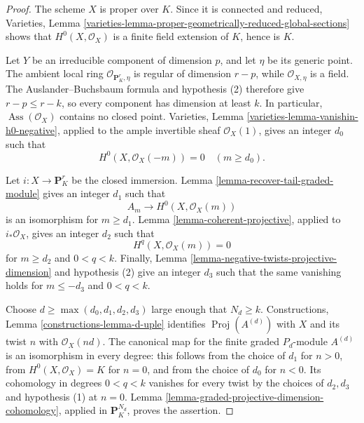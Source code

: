 \begin{proof}
The scheme $X$ is proper over $K$. Since it is connected and reduced,
Varieties, Lemma
\ref{varieties-lemma-proper-geometrically-reduced-global-sections} shows
that $H^0(X,\mathcal O_X)$ is a finite field extension of $K$, hence is
$K$.

Let $Y$ be an irreducible component of dimension $p$, and let $\eta$ be its
generic point. The ambient local ring $\mathcal O_{\mathbf P^r_K,\eta}$ is
regular of dimension $r-p$, while $\mathcal O_{X,\eta}$ is a field. The
Auslander--Buchsbaum formula and hypothesis (2) therefore give
$r-p\leq r-k$, so every component has dimension at least $k$. In particular,
$\operatorname{Ass}(\mathcal O_X)$ contains no closed point. Varieties,
Lemma \ref{varieties-lemma-vanishin-h0-negative}, applied to the ample
invertible sheaf $\mathcal O_X(1)$, gives an integer $d_0$ such that
$$
H^0(X,\mathcal O_X(-m))=0\quad(m\geq d_0).
$$

Let $i:X\to\mathbf P^r_K$ be the closed immersion. Lemma
\ref{lemma-recover-tail-graded-module} gives an integer $d_1$ such that
$$
A_m\longrightarrow H^0(X,\mathcal O_X(m))
$$
is an isomorphism for $m\geq d_1$. Lemma
\ref{lemma-coherent-projective}, applied to $i_*\mathcal O_X$, gives an
integer $d_2$ such that
$$
H^q(X,\mathcal O_X(m))=0
$$
for $m\geq d_2$ and $0<q<k$. Finally, Lemma
\ref{lemma-negative-twists-projective-dimension} and hypothesis (2) give
an integer $d_3$ such that the same vanishing holds for $m\leq-d_3$ and
$0<q<k$.

Choose $d\geq\max(d_0,d_1,d_2,d_3)$ large enough that $N_d\geq k$.
Constructions, Lemma \ref{constructions-lemma-d-uple} identifies
$\operatorname{Proj}(A^{(d)})$ with $X$ and its twist $n$ with
$\mathcal O_X(nd)$. The canonical map for the finite graded
$P_d$-module $A^{(d)}$ is an isomorphism in every degree: this follows from
the choice of $d_1$ for $n>0$, from $H^0(X,\mathcal O_X)=K$ for $n=0$,
and from the choice of $d_0$ for $n<0$. Its cohomology in degrees
$0<q<k$ vanishes for every twist by the choices of $d_2,d_3$ and hypothesis
(1) at $n=0$. Lemma
\ref{lemma-graded-projective-dimension-cohomology}, applied in
$\mathbf P^{N_d}_K$, proves the assertion.
\end{proof}

